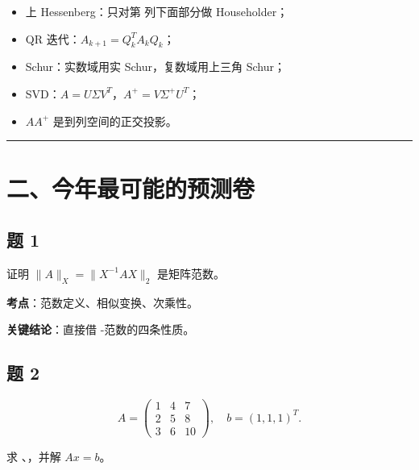 \documentclass[11pt,a4paper]{ctexart}
\newcommand{\code}[1]{\begingroup\ttfamily\small #1\endgroup}
\begin{document}
\begin{itemize}

\item 上 Hessenberg：只对第 \code{} 列下面部分做 Householder；

\item QR 迭代：$A_{k+1}=Q_k^T A_k Q_k$；

\item Schur：实数域用实 Schur，复数域用上三角 Schur；

\item SVD：$A=U\Sigma V^T$，$A^+=V\Sigma^+U^T$；

\item $AA^+$ 是到列空间的正交投影。

\end{itemize}

\bigskip\hrule\bigskip


\section*{二、今年最可能的预测卷}



\subsection*{题 1}


证明 $\|A\|_X=\|X^{-1}AX\|_2$ 是矩阵范数。

\textbf{考点}：范数定义、相似变换、次乘性。

\textbf{关键结论}：直接借 \code{}-范数的四条性质。


\subsection*{题 2}


\[
A=\begin{pmatrix}1&4&7\\2&5&8\\3&6&10\end{pmatrix},\quad
b=(1,1,1)^T.
\]

求 \code{}、\code{}，并解 $Ax=b$。
\end{document}
